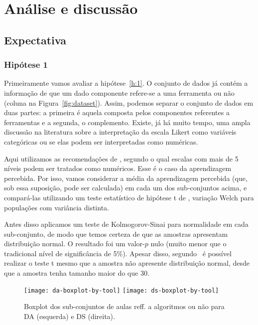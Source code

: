 \section{Análise e discussão}

\subsection{Expectativa}

\subsubsection{Hipótese 1}

Primeiramente vamos avaliar a hipótese~\ref{h:1}.
O conjunto de dados já contém a informação de que um dado componente refere-se a uma ferramenta ou não (coluna  na Figura~\ref{fig:dataset}).
Assim, podemos separar o conjunto de dados em duas partes: a primeira é aquela composta pelos componentes referentes a ferramentas e a segunda, o complemento.
Existe, já há muito tempo, uma ampla discussão na literatura sobre a interpretação da escala Likert como variáveis categóricas ou se elas podem ser interpretadas como numéricas.

Aqui utilizamos as recomendações de \cite{Harpe2015}, segundo o qual escalas com mais de 5 níveis podem ser tratados como numéricos.
Esse é o caso da aprendizagem percebida.
Por isso, vamos considerar a média da aprendizagem percebida (que, sob essa suposição, pode ser calculada) em cada um dos sub-conjuntos acima, e compará-las utilizando um teste estatístico de hipótese t de , variação Welch para populações com variância distinta.

Antes disso aplicamos um teste de Kolmogorov-Sinai para normalidade em cada sub-conjunto, de modo que temos certeza de que as amostras apresentam distribuição normal.
O resultado foi um valor-$p$ nulo (muito menor que o tradicional nível de significância de 5\%).
Apesar disso, segundo~\cite[p.~259]{Triola2005} é possível realizar o teste t mesmo que a amostra não apresente distribuição normal, desde que a amostra tenha tamanho maior do que 30.

\begin{figure}
	\centering
	\texttt{[image: da-boxplot-by-tool]}\hfill
	\texttt{[image: ds-boxplot-by-tool]}
	\caption{Boxplot dos sub-conjuntos de aulas reff. a algoritmos ou não para DA (esquerda) e DS (direita).}
\end{figure}

